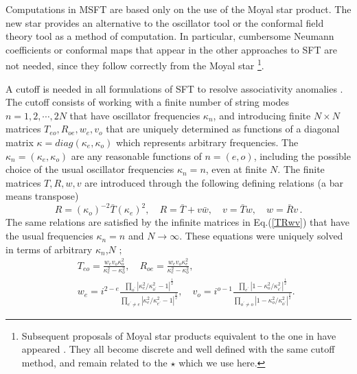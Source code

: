 \documentclass[a4paper,11pt]{article}
\begin{document}
Computations in MSFT are based only on the use of the Moyal star product.
The new star provides an alternative to the oscillator tool or the conformal
field theory tool as a method of computation. In particular, cumbersome
Neumann coefficients or conformal maps that appear in the other approaches
to SFT are not needed, since they follow correctly from the Moyal star \cite%
{BM2}\footnote{%
Subsequent proposals of Moyal star products equivalent to the one in \cite{B}
have appeared \cite{DLMZ}\cite{Moyal}\cite{moyalMoscow}. They all become
discrete and well defined with the same cutoff method, and remain related to
the $\star $ which we use here.}.

A cutoff is needed in all formulations of SFT to resolve associativity
anomalies \cite{BM1}. The cutoff consists of working with a finite number of
string modes $n=1,2,\cdots ,2N$ that have oscillator frequencies $\kappa
_{n} $, and introducing finite $N\times N$ matrices $%
T_{eo},R_{oe},w_{e},v_{o}$ that are uniquely determined as functions of a
diagonal matrix $\kappa =diag\left( \kappa _{e},\kappa _{o}\right) $ which
represents arbitrary frequencies. The $\kappa _{n}=\left( \kappa _{e},\kappa
_{o}\right) $ are any reasonable functions of $n=\left( e,o\right) $,
including the possible choice of the usual oscillator frequencies $\kappa
_{n}=n$, even at finite $N $. The finite matrices $T,R,w,v$ are introduced
through the following defining relations (a bar means transpose)
\begin{equation}
R=\left( \kappa _{o}\right) ^{-2}\bar{T}\left( \kappa _{e}\right) ^{2},\quad
R=\bar{T}+v\bar{w},\quad v=\bar{T}w,\quad w=\bar{R}v\,.  \label{define}
\end{equation}%
The same relations are satisfied by the infinite matrices in Eq.(\ref{TRwv})
that have the usual frequencies $\kappa _{n}=n$ and $N\rightarrow \infty .$
These equations were uniquely solved in terms of arbitrary $\kappa _{n}$,$N$
\cite{BM2}$;$ %
\begin{eqnarray}
&&T_{eo}=\frac{w_{e}v_{o}\kappa _{o}^{2}}{\kappa _{e}^{2}-\kappa _{o}^{2}}%
,\quad R_{oe}=\frac{w_{e}v_{o}\kappa _{e}^{2}}{\kappa
_{e}^{2}-\kappa
_{o}^{2}}, \label{TR_exp}\\
&&w_{e}={i^{2-e}}\frac{\prod_{o^{\prime }}\left\vert \kappa
_{e}^{2}/\kappa _{o^{\prime }}^{2}-1\right\vert
^{\frac{1}{2}}}{\prod_{e^{\prime }\neq e}\left\vert \kappa
_{e}^{2}/\kappa _{e^{\prime}}^{2}-1\right\vert ^{\frac{1}{2}}},\quad
 v_{o}={i^{o-1}}
\frac{\prod_{e^{\prime }}\left\vert 1-\kappa _{o}^{2}/\kappa
_{e^{\prime }}^{2}\right\vert ^{\frac{1}{2}}}{\prod_{o^{\prime
}\neq o}\left\vert 1-\kappa _{o}^{2}/\kappa _{o^{\prime
}}^{2}\right\vert ^{\frac{1}{2}}}.\label{wv_exp}
\end{eqnarray}
\end{document}
